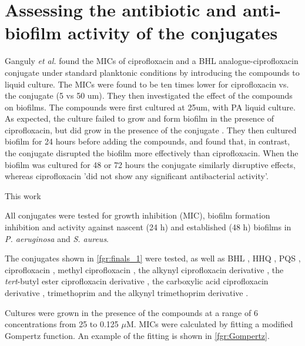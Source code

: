 \newpage

\section{Assessing the antibiotic and anti-biofilm activity of the conjugates}

Ganguly \textit{et al.} \cite{Ganguly2011} found the MICs of ciprofloxacin and a BHL analogue-ciprofloxacin conjugate  under standard planktonic conditions by introducing the compounds to liquid culture. The MICs were found to be ten times lower for ciprofloxacin vs. the conjugate  (5 vs 50 um). They then investigated the effect of the compounds on biofilms. The compounds were first cultured at 25um, with PA liquid culture. As expected, the culture failed to grow and form biofilm in the presence of ciprofloxacin, but did grow in the presence of the conjugate . They then cultured biofilm for 24 hours before adding the compounds, and found that, in contrast, the conjugate  disrupted the biofilm more effectively than ciprofloxacin. When the biofilm was cultured for 48 or 72 hours the conjugate similarly disruptive effects, whereas ciprofloxacin 'did not show any significant antibacterial activity'.

This work 

All conjugates were tested for growth inhibition (MIC), biofilm formation inhibition and activity against nascent (24 h) and established (48 h) biofilms in \textit{P. aeruginosa} and \textit{S. aureus}.

The conjugates shown in \ref{fgr:finals_1} were tested, as well as BHL , HHQ , PQS , ciprofloxacin , methyl ciprofloxacin , the alkynyl ciprofloxacin derivative , the \textit{tert}-butyl ester ciprofloxacin derivative , the carboxylic acid ciprofloxacin derivative , trimethoprim  and the alkynyl trimethoprim derivative .

Cultures were grown in the presence of the compounds at a range of 6 concentrations from 25 to 0.125 $\mu$M. MICs were calculated by fitting a modified Gompertz function\cite{Lambert2016}. An example of the fitting is shown in \ref{fgr:Gompertz}. 

